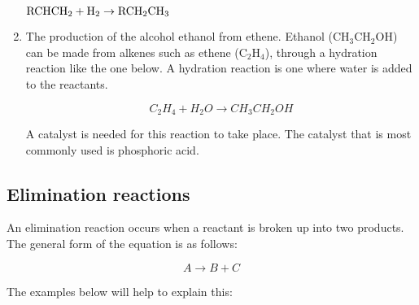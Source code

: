 \begin{enumerate}
{\begin{center}
$\rm{RCHCH_{2} + H_{2} \rightarrow RCH_{2}CH_{3}}$ 
\end{center}
}

\item{The production of the alcohol ethanol from ethene. Ethanol (CH$_{3}$CH$_{2}$OH) can be made from alkenes such as ethene (C$_{2}$H$_{4}$), through a hydration reaction like the one below. A hydration reaction is one where water is added to the reactants.

\begin{equation*}
C_{2}H_{4} + H_{2}O  \rightarrow CH_{3}CH_{2}OH 
\end{equation*}

A catalyst is needed for this reaction to take place. The catalyst that is most commonly used is phosphoric acid. 
}

\end{enumerate}


\subsection{Elimination reactions}

An elimination reaction occurs when a reactant is broken up into two products. The general form of the equation is as follows:

\begin{equation*}
A \rightarrow B + C
\end{equation*}

The examples below will help to explain this:

